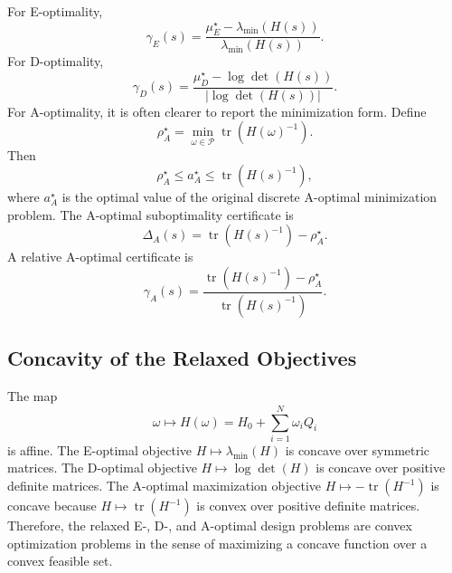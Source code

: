 \documentclass[letterpaper, 9
 pt, conference]{ieeeconf}
\begin{document}
For E-optimality,
\begin{equation}
    \gamma_E(s)
    =
    \frac{
    \mu_E^\star-\lambda_{\min}(H(s))
    }{
    \lambda_{\min}(H(s))
    }.
\end{equation}
For D-optimality,
\begin{equation}
    \gamma_D(s)
    =
    \frac{
    \mu_D^\star-\log\det(H(s))
    }{
    |\log\det(H(s))|
    }.
\end{equation}
For A-optimality, it is often clearer to report the minimization form. Define
\begin{equation}
    \rho_A^\star
    =
    \min_{\omega\in\mathcal{P}}
    \operatorname{tr}(H(\omega)^{-1}).
\end{equation}
Then
\begin{equation}
    \rho_A^\star
    \leq
    a_A^\star
    \leq
    \operatorname{tr}(H(s)^{-1}),
\end{equation}
where $a_A^\star$ is the optimal value of the original discrete A-optimal minimization problem. The A-optimal suboptimality certificate is
\begin{equation}
    \Delta_A(s)
    =
    \operatorname{tr}(H(s)^{-1})
    -
    \rho_A^\star.
\end{equation}
A relative A-optimal certificate is
\begin{equation}
    \gamma_A(s)
    =
    \frac{
    \operatorname{tr}(H(s)^{-1})-\rho_A^\star
    }{
    \operatorname{tr}(H(s)^{-1})
    }.
\end{equation}

\subsection{Concavity of the Relaxed Objectives}
\label{subsec:concavity}

The map
\begin{equation}
    \omega
    \mapsto
    H(\omega)
    =
    H_0+\sum_{i=1}^{N}\omega_iQ_i
\end{equation}
is affine. The E-optimal objective $H\mapsto\lambda_{\min}(H)$ is concave over symmetric matrices. The D-optimal objective $H\mapsto\log\det(H)$ is concave over positive definite matrices. The A-optimal maximization objective $H\mapsto-\operatorname{tr}(H^{-1})$ is concave because $H\mapsto\operatorname{tr}(H^{-1})$ is convex over positive definite matrices. Therefore, the relaxed E-, D-, and A-optimal design problems are convex optimization problems in the sense of maximizing a concave function over a convex feasible set.
\end{document}
